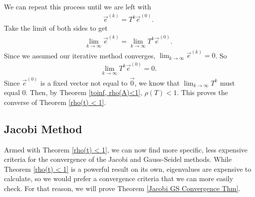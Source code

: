 \documentclass[12pt,letterpaper]{article}
\newtheorem{thm}{Theorem}[section]
\theoremstyle{definition}
\begin{document}
\noindent We can repeat this process until we are left with \begin{align*}\vec{e}^{(k)} = T^{k}\vec{e}^{(0)}.\end{align*} 
\noindent Take the limit of both sides to get \begin{align*}\lim_{k \to \infty}\vec{e}^{(k)} = \lim_{k \to \infty}T^{k}\vec{e}^{(0)}.\end{align*} Since we assumed our iterative method converges, $\lim_{k \to \infty}\vec{e}^{(k)} = 0$. So \begin{align*}\lim_{k \to \infty}T^{k}\vec{e}^{(0)} = 0.\end{align*} 
\noindent Since $\vec{e}^{(0)}$ is a fixed vector not equal to $\vec{0}$, we know that $\lim_{k \to \infty}T^{k}$ must equal $0$. Then, by Theorem \ref{toinf, rho(A)<1}, $\rho(T)<1$. This proves the converse of Theorem \ref{rho(t) < 1}.





\subsection{Jacobi Method}

Armed with Theorem \ref{rho(t) < 1}, we can now find more specific, less expensive criteria for the convergence of the Jacobi and Gauss-Seidel methods. While Theorem \ref{rho(t) < 1} is a powerful result on its own, eigenvalues are expensive to calculate, so we would prefer a convergence criteria that we can more easily check. For that reason, we will prove Theorem \ref{Jacobi GS Convergence Thm}.
\end{document}
